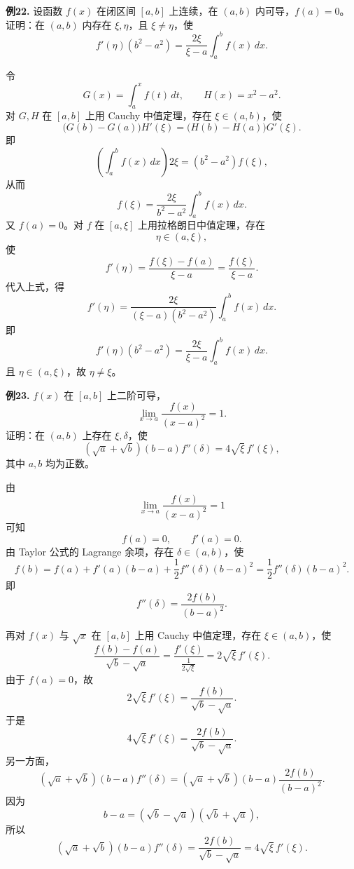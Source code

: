 \begin{problemblock}
\textbf{例22.} 设函数 \(f(x)\) 在闭区间 \([a,b]\) 上连续，在 \((a,b)\) 内可导，\(f(a)=0\)。证明：在 \((a,b)\) 内存在 \(\xi,\eta\)，且 \(\xi\ne\eta\)，使
\[
f'(\eta)(b^2-a^2)=\frac{2\xi}{\xi-a}\int_a^b f(x)\,dx.
\]
\end{problemblock}
\begin{solutionblock}
令
\[
G(x)=\int_a^x f(t)\,dt,\qquad H(x)=x^2-a^2.
\]
对 \(G,H\) 在 \([a,b]\) 上用 Cauchy 中值定理，存在 \(\xi\in(a,b)\)，使
\[
\bigl(G(b)-G(a)\bigr)H'(\xi)
=\bigl(H(b)-H(a)\bigr)G'(\xi).
\]
即
\[
\left(\int_a^b f(x)\,dx\right)2\xi
=(b^2-a^2)f(\xi),
\]
从而
\[
f(\xi)=\frac{2\xi}{b^2-a^2}\int_a^b f(x)\,dx.
\]
又 \(f(a)=0\)。对 \(f\) 在 \([a,\xi]\) 上用拉格朗日中值定理，存在
\[
\eta\in(a,\xi),
\]
使
\[
f'(\eta)=\frac{f(\xi)-f(a)}{\xi-a}
=\frac{f(\xi)}{\xi-a}.
\]
代入上式，得
\[
f'(\eta)
=\frac{2\xi}{(\xi-a)(b^2-a^2)}
\int_a^b f(x)\,dx.
\]
即
\[
f'(\eta)(b^2-a^2)=\frac{2\xi}{\xi-a}\int_a^b f(x)\,dx.
\]
且 \(\eta\in(a,\xi)\)，故 \(\eta\ne\xi\)。
\end{solutionblock}

\begin{problemblock}
\textbf{例23.} \(f(x)\) 在 \([a,b]\) 上二阶可导，
\[
\lim_{x\to a}\frac{f(x)}{(x-a)^2}=1.
\]
证明：在 \((a,b)\) 上存在 \(\xi,\delta\)，使
\[
(\sqrt a+\sqrt b)(b-a)f''(\delta)=4\sqrt{\xi}\,f'(\xi),
\]
其中 \(a,b\) 均为正数。
\end{problemblock}
\begin{solutionblock}
由
\[
\lim_{x\to a}\frac{f(x)}{(x-a)^2}=1
\]
可知
\[
f(a)=0,\qquad f'(a)=0.
\]
由 Taylor 公式的 Lagrange 余项，存在 \(\delta\in(a,b)\)，使
\[
f(b)=f(a)+f'(a)(b-a)+\frac12 f''(\delta)(b-a)^2
=\frac12 f''(\delta)(b-a)^2.
\]
即
\[
f''(\delta)=\frac{2f(b)}{(b-a)^2}.
\]

再对 \(f(x)\) 与 \(\sqrt x\) 在 \([a,b]\) 上用 Cauchy 中值定理，存在 \(\xi\in(a,b)\)，使
\[
\frac{f(b)-f(a)}{\sqrt b-\sqrt a}
=\frac{f'(\xi)}{\frac1{2\sqrt{\xi}}}
=2\sqrt{\xi}\,f'(\xi).
\]
由于 \(f(a)=0\)，故
\[
2\sqrt{\xi}\,f'(\xi)=\frac{f(b)}{\sqrt b-\sqrt a}.
\]
于是
\[
4\sqrt{\xi}\,f'(\xi)=\frac{2f(b)}{\sqrt b-\sqrt a}.
\]
另一方面，
\[
(\sqrt a+\sqrt b)(b-a)f''(\delta)
=(\sqrt a+\sqrt b)(b-a)\frac{2f(b)}{(b-a)^2}.
\]
因为
\[
b-a=(\sqrt b-\sqrt a)(\sqrt b+\sqrt a),
\]
所以
\[
(\sqrt a+\sqrt b)(b-a)f''(\delta)
=\frac{2f(b)}{\sqrt b-\sqrt a}
=4\sqrt{\xi}\,f'(\xi).
\]
\end{solutionblock}

